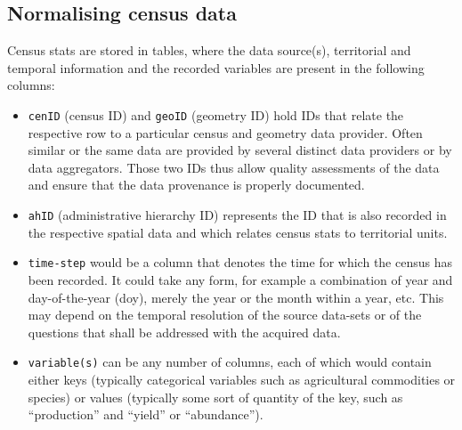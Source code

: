 \documentclass[12pt,]{article}
\providecommand{\tightlist}{%
  \setlength{\itemsep}{0pt}\setlength{\parskip}{0pt}}
\begin{document}
\hypertarget{normalising-census-data}{%
\subsection{Normalising census data}\label{normalising-census-data}}

Census stats are stored in tables, where the data source(s), territorial and temporal information and the recorded variables are present in the following columns:

\begin{itemize}
\tightlist
\item
  \texttt{cenID} (census ID) and \texttt{geoID} (geometry ID) hold IDs that relate the respective row to a particular census and geometry data provider.
  Often similar or the same data are provided by several distinct data providers or by data aggregators.
  Those two IDs thus allow quality assessments of the data and ensure that the data provenance is properly documented.
\item
  \texttt{ahID} (administrative hierarchy ID) represents the ID that is also recorded in the respective spatial data and which relates census stats to territorial units.
\item
  \texttt{time-step} would be a column that denotes the time for which the census has been recorded. It could take any form, for example a combination of year and day-of-the-year (doy), merely the year or the month within a year, etc. This may depend on the temporal resolution of the source data-sets or of the questions that shall be addressed with the acquired data.
\item
  \texttt{variable(s)} can be any number of columns, each of which would contain either keys (typically categorical variables such as agricultural commodities or species) or values (typically some sort of quantity of the key, such as ``production'' and ``yield'' or ``abundance'').
\end{itemize}
\end{document}
